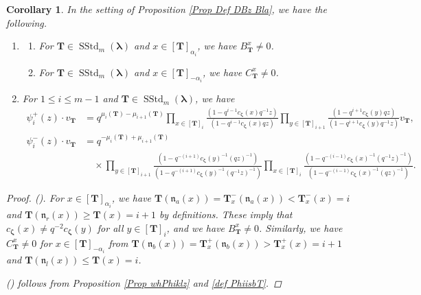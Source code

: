 \documentclass[12pt]{amsart}
\newtheorem{cor}[thm]{Corollary}
\numberwithin{equation}{thm}
\newcommand\bT{\mathbf T}
\newcommand\fn{\mathfrak n}
\renewcommand\a{\alpha}  %
\newcommand\Bz{\boldsymbol\zeta}
\newcommand\Bla{\boldsymbol\lambda}
\newcommand{\SStd}{\operatorname{SStd}}
\newcounter{ichi}
\newcommand{\roi}{\roman{ichi}}
\newcounter{ni}
\newcommand{\roii}{\roman{ni}}
\begin{document}
\begin{cor}
\label{Cor BbTx not=0} 
In the setting of Proposition \ref{Prop Def DBz Bla}, 
we have the following. 
\begin{enumerate}
\item 
\begin{enumerate}
\item 
For $\bT \in \SStd_m (\Bla)$ and $x \in [\bT]_{\a_i}$, 
we have $B_{\bT}^x \not=0$. 

\item 
For $\bT \in \SStd_m(\Bla)$ and $x \in [\bT]_{-\a_i}$, 
we have $C_{\bT}^x \not=0$. 
\end{enumerate}

\item 
For $1 \leq i \leq m-1$ and $\bT \in \SStd_m (\Bla)$, we have 
\begin{align*}
\psi_i^+(z) \cdot v_{\bT} 
	&= q^{\mu_i(\bT) - \mu_{i+1} (\bT)} 
		\prod_{x \in [\bT]_i} \frac{(1 - q^{i-1} c_{\Bz}(x) q^{-1} z)}{ (1 - q^{i-1} c_{\Bz} (x) q z)} 
		\prod_{ y \in [\bT]_{i+1}} \frac{(1 - q^{i+1} c_{\Bz} (y) q z)}{( 1 - q^{i+1} c_{\Bz} (y) q^{-1} z)} v_{\bT}, 
\\
\psi_i^-(z) \cdot v_{\bT} 
	&= q^{ - \mu_i(\bT) + \mu_{i+1} (\bT)} 
		\\ & \quad \times 
		\prod_{ y \in [\bT]_{i+1}} \frac{ ( 1 -  q^{- (i +1)} c_{\Bz} (y)^{-1}  (qz)^{-1} )}{ ( 1 - q^{-(i+1)} c_{\Bz} (y)^{-1} (q^{-1} z)^{-1})}
		\prod_{ x \in [\bT]_i} \frac{(1 -  q^{-(i-1)} c_{\Bz}(x)^{-1}  (q^{-1}z)^{-1})}{(1 - q^{-(i-1)} c_{\Bz}(x)^{-1}  (qz)^{-1})}.
\end{align*}
\end{enumerate}
\begin{proof}
(\roi). 
For $x \in [\bT]_{\a_i}$, 
we have $ \bT(\fn_a(x)) = \bT_x^- (\fn_a(x)) < \bT_x^-(x) =i$ and 
$\bT(\fn_r(x)) \geq \bT(x) =i+1$ by definitions. 
These imply that $c_{\Bz}(x) \not= q^{-2} c_{\Bz}(y)$ for all $y \in [\bT]_i$, 
and we have $B_{\bT}^x \not=0$. 
Similarly, we have $C_{\bT}^x \not=0$ for $x \in [\bT]_{-\a_i}$ from 
$\bT(\fn_b(x)) = \bT_x^+(\fn_b(x)) > \bT_x^+(x) =i+1$ and $\bT(\fn_l(x)) \leq \bT(x) =i$. 

(\roii) follows from Proposition \ref{Prop whPhiklz} and \eqref{def PhiisbT}. 
\end{proof}
\end{cor}
\end{document}
